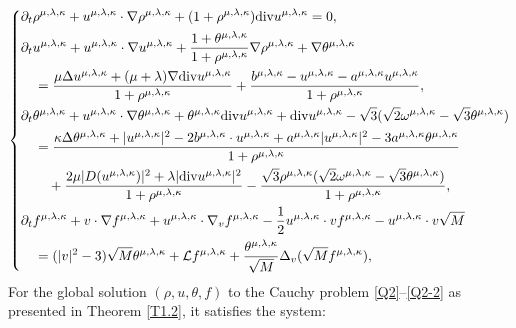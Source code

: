 \documentclass[reqno,11pt]{amsart}
\theoremstyle{plain}
\numberwithin{equation}{section}
\begin{document}
\begin{equation}\label{G4.1}
\left\{\begin{aligned}
&\partial_t \rho^{\mu,\lambda,\kappa} +u^{\mu,\lambda,\kappa} \cdot \nabla \rho^{\mu,\lambda,\kappa}+(1+\rho^{\mu,\lambda,\kappa}) {\rm div} u^{\mu,\lambda,\kappa}=0, \\
&\partial_t u^{\mu,\lambda,\kappa} +u^{\mu,\lambda,\kappa} \cdot \nabla u^{\mu,\lambda,\kappa}+\frac{1+\theta^{\mu,\lambda,\kappa}}{1+\rho^{\mu,\lambda,\kappa}} \nabla \rho^{\mu,\lambda,\kappa}+\nabla \theta^{\mu,\lambda,\kappa}\\
&\quad=\frac{ \mu\Delta  u^{\mu,\lambda,\kappa}+(\mu+\lambda)\nabla{\rm div}  u^{\mu,\lambda,\kappa} }{1+\rho^{\mu,\lambda,\kappa}}  
+\frac{b^{\mu,\lambda,\kappa}-u^{\mu,\lambda,\kappa}-a^{\mu,\lambda,\kappa} u^{\mu,\lambda,\kappa}}{1+\rho^{\mu,\lambda,\kappa}}, \\
&\partial_t \theta^{\mu,\lambda,\kappa} +u^{\mu,\lambda,\kappa} \cdot \nabla \theta^{\mu,\lambda,\kappa}+\theta^{\mu,\lambda,\kappa}  {\rm div} u^{\mu,\lambda,\kappa}+{\rm div} u^{\mu,\lambda,\kappa}-\sqrt{3}(\sqrt{2} \omega^{\mu,\lambda,\kappa}-\sqrt{3} \theta^{\mu,\lambda,\kappa})  \\
&\quad =\frac{ \kappa\Delta  \theta^{\mu,\lambda,\kappa}+|u^{\mu,\lambda,\kappa}|^2-2 b^{\mu,\lambda,\kappa} \cdot u^{\mu,\lambda,\kappa}+a^{\mu,\lambda,\kappa}|u^{\mu,\lambda,\kappa}|^2-3 a^{\mu,\lambda,\kappa} \theta^{\mu,\lambda,\kappa}  }{1+\rho^{\mu,\lambda,\kappa}}  \\
&\qquad + \frac{2\mu |D(u^{\mu,\lambda,\kappa})|^2+\lambda|{\rm div}  u^{\mu,\lambda,\kappa}|^2 }{1+\rho^{\mu,\lambda,\kappa}}-\frac{\sqrt{3}\rho^{\mu,\lambda,\kappa}(\sqrt{2} \omega^{\mu,\lambda,\kappa}-\sqrt{3} \theta^{\mu,\lambda,\kappa})}{1+\rho^{\mu,\lambda,\kappa}},\\
&\partial_t f^{\mu,\lambda,\kappa} +v \cdot \nabla f^{\mu,\lambda,\kappa}+u^{\mu,\lambda,\kappa} \cdot \nabla_v f^{\mu,\lambda,\kappa}-\frac{1}{2} u^{\mu,\lambda,\kappa} \cdot v f^{\mu,\lambda,\kappa}-
u^{\mu,\lambda,\kappa} \cdot v \sqrt{M}  \\
&\quad = (|v|^2-3 ) \sqrt{M} \theta^{\mu,\lambda,\kappa}+\mathcal{L} f^{\mu,\lambda,\kappa}+\frac{\theta^{\mu,\lambda,\kappa}}{\sqrt{M}} \Delta_v(\sqrt{M} f^{\mu,\lambda,\kappa}), \\
\end{aligned}\right.
\end{equation} 
For the global solution $(\rho, u, \theta, f)$ to the Cauchy problem \eqref{Q2}--\eqref{Q2-2} as presented in Theorem \ref{T1.2}, it  satisfies the system: 
\end{document}

